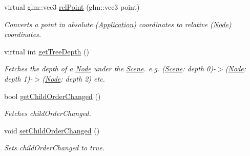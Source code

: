 \begin{DoxyCompactItemize}
virtual glm\+::vec3 \mbox{\hyperlink{classsage_1_1Node_a40edd1724c0956ef7794225fba8353c0}{rel\+Point}} (glm\+::vec3 point)
\begin{DoxyCompactList}\small\item\em Converts a point in absolute (\mbox{\hyperlink{classsage_1_1Application}{Application}}) coordinates to relative (\mbox{\hyperlink{classsage_1_1Node}{Node}}) coordinates. \end{DoxyCompactList}\item 
virtual int \mbox{\hyperlink{classsage_1_1Node_a91e68b6452280bd6d273ff62105a5fe8}{get\+Tree\+Depth}} ()
\begin{DoxyCompactList}\small\item\em Fetches the depth of a \mbox{\hyperlink{classsage_1_1Node}{Node}} under the \mbox{\hyperlink{classsage_1_1Scene}{Scene}}. e.\+g. (\mbox{\hyperlink{classsage_1_1Scene}{Scene}}\+: depth 0)-\/$>$(\mbox{\hyperlink{classsage_1_1Node}{Node}}\+: depth 1)-\/$>$(\mbox{\hyperlink{classsage_1_1Node}{Node}}\+: depth 2) etc. \end{DoxyCompactList}\item 
bool \mbox{\hyperlink{classsage_1_1Node_a983910d41113519eb25d015eac2b4ad0}{get\+Child\+Order\+Changed}} ()
\begin{DoxyCompactList}\small\item\em Fetches child\+Order\+Changed. \end{DoxyCompactList}\item 
void \mbox{\hyperlink{classsage_1_1Node_adaf7f298bffc7e09d6b4dd4f7c7e0e1a}{set\+Child\+Order\+Changed}} ()
\begin{DoxyCompactList}\small\item\em Sets child\+Order\+Changed to true. \end{DoxyCompactList}\end{DoxyCompactItemize}
